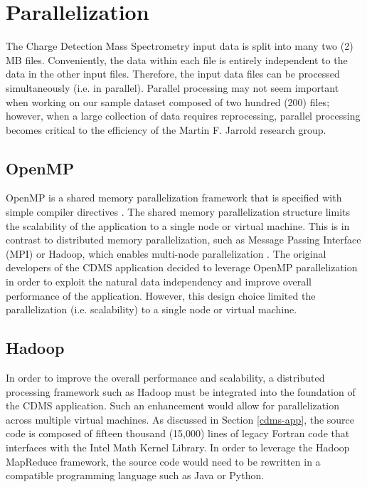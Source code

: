 \documentclass[9pt,twocolumn,twoside]{../../styles/osajnl}
\begin{document}
\section{Parallelization} \label{parallel}
The Charge Detection Mass Spectrometry input data is split into many
two (2) MB files. Conveniently, the data within each file is entirely
independent to the data in the other input files. Therefore, the input
data files can be processed simultaneously (i.e. in
parallel). Parallel processing may not seem important when working on
our sample dataset composed of two hundred (200) files; however, when
a large collection of data requires reprocessing, parallel processing
becomes critical to the efficiency of the Martin F. Jarrold research
group.
\subsection{OpenMP} \label{openmp-code}
OpenMP is a shared memory parallelization framework that is specified
with simple compiler directives \cite{www-openmp}. The shared memory
parallelization structure limits the scalability of the application to
a single node or virtual machine. This is in contrast to distributed
memory parallelization, such as Message Passing Interface (MPI) or
Hadoop, which enables multi-node parallelization \cite{www-mpi,
  www-hadoop}. The original developers of the CDMS application decided
to leverage OpenMP parallelization in order to exploit the natural
data independency and improve overall performance of the
application. However, this design choice limited the parallelization
(i.e. scalability) to a single node or virtual machine.

\subsection{Hadoop}
In order to improve the overall performance and scalability, a
distributed processing framework such as Hadoop must be integrated
into the foundation of the CDMS application. Such an enhancement would
allow for parallelization across multiple virtual machines. As
discussed in Section \ref{cdms-app}, the source code is composed of
fifteen thousand (15,000) lines of legacy Fortran code that interfaces
with the Intel Math Kernel Library. In order to leverage the Hadoop
MapReduce framework, the source code would need to be rewritten in a
compatible programming language such as Java or Python.
\end{document}
